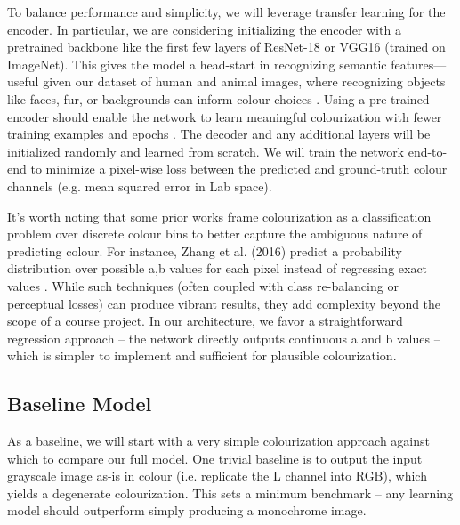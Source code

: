 \documentclass{article} %
\begin{document}
To balance performance and simplicity, we will leverage transfer learning for the encoder. In particular, we are considering initializing the encoder with a pretrained backbone like the first few layers of ResNet-18 or VGG16 (trained on ImageNet). This gives the model a head-start in recognizing semantic features—useful given our dataset of human and animal images, where recognizing objects like faces, fur, or backgrounds can inform colour choices \citep{olah2022lettherebecolor}. Using a pre-trained encoder should enable the network to learn meaningful colourization with fewer training examples and epochs \citep{olah2022lettherebecolor}. The decoder and any additional layers will be initialized randomly and learned from scratch. We will train the network end-to-end to minimize a pixel-wise loss between the predicted and ground-truth colour channels (e.g. mean squared error in Lab space).

It’s worth noting that some prior works frame colourization as a classification problem over discrete colour bins to better capture the ambiguous nature of predicting colour. For instance, Zhang et al. (2016) predict a probability distribution over possible a,b values for each pixel instead of regressing exact values \citep{olah2022lettherebecolor}. While such techniques (often coupled with class re-balancing or perceptual losses) can produce vibrant results, they add complexity beyond the scope of a course project. In our architecture, we favor a straightforward regression approach – the network directly outputs continuous a and b values – which is simpler to implement and sufficient for plausible colourization.

\subsection{Baseline Model}

As a baseline, we will start with a very simple colourization approach against which to compare our full model. One trivial baseline is to output the input grayscale image as-is in colour (i.e. replicate the L channel into RGB), which yields a degenerate colourization. This sets a minimum benchmark – any learning model should outperform simply producing a monochrome image.
\end{document}

